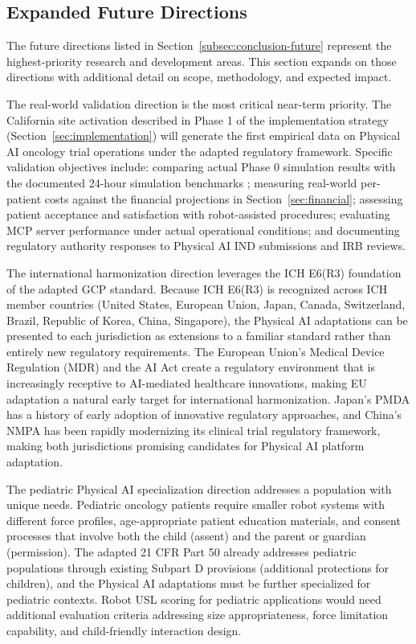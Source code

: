 \subsection{Expanded Future Directions}
\label{subsec:conclusion-expanded-future}

The future directions listed in Section~\ref{subsec:conclusion-future}
represent the highest-priority research and development areas. This section
expands on those directions with additional detail on scope, methodology, and
expected impact.

The real-world validation direction is the most critical near-term priority.
The California site activation described in Phase 1 of the implementation
strategy (Section~\ref{sec:implementation}) will generate the first empirical
data on Physical AI oncology trial operations under the adapted regulatory
framework. Specific validation objectives include: comparing actual Phase 0
simulation results with the documented 24-hour simulation benchmarks
\cite{site-docs}; measuring real-world per-patient costs against the financial
projections in Section~\ref{sec:financial}; assessing patient acceptance and
satisfaction with robot-assisted procedures; evaluating MCP server performance
under actual operational conditions; and documenting regulatory authority
responses to Physical AI IND submissions and IRB reviews.

The international harmonization direction leverages the ICH E6(R3) foundation
of the adapted GCP standard. Because ICH E6(R3) \cite{ich-e6r3} is recognized
across ICH member countries (United States, European Union, Japan, Canada,
Switzerland, Brazil, Republic of Korea, China, Singapore), the Physical AI
adaptations can be presented to each jurisdiction as extensions to a familiar
standard rather than entirely new regulatory requirements. The European Union's
Medical Device Regulation (MDR) and the AI Act create a regulatory environment
that is increasingly receptive to AI-mediated healthcare innovations, making
EU adaptation a natural early target for international harmonization. Japan's
PMDA has a history of early adoption of innovative regulatory approaches, and
China's NMPA has been rapidly modernizing its clinical trial regulatory
framework, making both jurisdictions promising candidates for Physical AI
platform adaptation.

The pediatric Physical AI specialization direction addresses a population with
unique needs. Pediatric oncology patients require smaller robot systems with
different force profiles, age-appropriate patient education materials, and
consent processes that involve both the child (assent) and the parent or
guardian (permission). The adapted 21 CFR Part 50 \cite{cfr50-adapt} already
addresses pediatric populations through existing Subpart D provisions
(additional protections for children), and the Physical AI adaptations must
be further specialized for pediatric contexts. Robot USL scoring for
pediatric applications would need additional evaluation criteria addressing
size appropriateness, force limitation capability, and child-friendly
interaction design.

